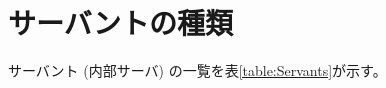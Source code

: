 \section{サーバントの種類}

     サーバント (内部サーバ) の一覧を表\ref{table:Servants}が示す。

\begin{comment}
\begin{verbatim}
      *----------------------------------------------------------
      |  #c    コンソール                                       
      |  #e    環境変数記憶簿                                   
      |  #l    Etherネットデバイス 
      |  #f    フロップーディスク                               
      |  #I    IPプロトコルインタフェース
      |  #X    ルップバックリンク                               
      |  #M    サーバマウントの機構                             
      |  #|    パイプ     
      |  #R    Rootファイルシステム                             
      |  #S    ストレッジデバイス                               
      |  #s    サーバ登録簿 (Server registray)                  
      |  #U    USBホストコントローラ                            
      |  #v    VGAコントローラ                                  
      *---------------------------------------------------------
\end{verbatim}      
\end{comment}


